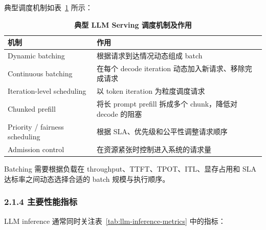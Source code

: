 典型调度机制如表~\ref{tab:serving-scheduling-mechanisms} 所示：


\begin{table}[!htbp]
    \centering
    \caption{\textbf{典型 LLM Serving 调度机制及作用}}
    \label{tab:serving-scheduling-mechanisms}
    \renewcommand{\arraystretch}{1.45}
    \scriptsize
    \setlength{\tabcolsep}{4pt}
    \begin{tabularx}{\textwidth}{@{}>{\hsize=0.55\hsize\raggedright\arraybackslash}X >{\hsize=1.45\hsize\raggedright\arraybackslash}X@{}}
        \toprule
        \textbf{机制} & \textbf{作用} \\
        \midrule
        Dynamic batching & 根据请求到达情况动态组成 batch \\
        \tabrowrule
        Continuous batching & 在每个 decode iteration 动态加入新请求、移除完成请求 \\
        \tabrowrule
        Iteration-level scheduling & 以 token iteration 为粒度调度请求 \\
        \tabrowrule
        Chunked prefill & 将长 prompt prefill 拆成多个 chunk，降低对 decode 的阻塞 \\
        \tabrowrule
        Priority / fairness scheduling & 根据 SLA、优先级和公平性调整请求顺序 \\
        \tabrowrule
        Admission control & 在资源紧张时控制进入系统的请求量 \\
        \bottomrule
    \end{tabularx}
\end{table}


Batching 需要根据负载在 throughput、TTFT、TPOT、ITL、显存占用和 SLA 达标率之间动态选择合适的 batch 规模与执行顺序。




\subsubsection*{2.1.4 主要性能指标}

LLM inference 通常同时关注表~\ref{tab:llm-inference-metrics} 中的指标：


